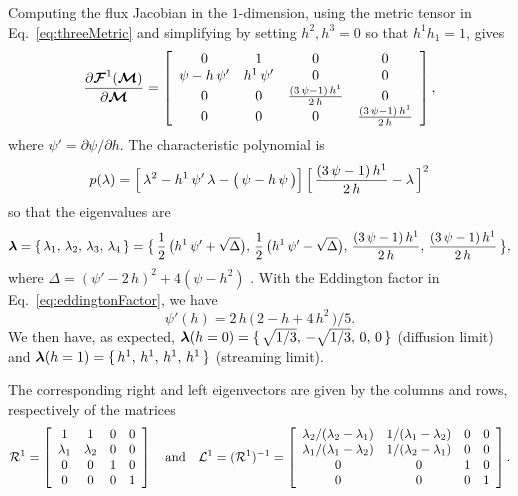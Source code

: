 \documentclass[10pt,preprint]{aastex}
\begin{document}
Computing the flux Jacobian in the $1$-dimension, using the metric tensor in Eq.~\eqref{eq:threeMetric} and simplifying by setting $h^{2},h^{3}=0$ so that $h^{1}h_{1}=1$, gives
\begin{equation}
  \frac{\partial \boldsymbol{\mathcal{F}}^{1}(\boldsymbol{\mathcal{M}})}{\partial \boldsymbol{\mathcal{M}}}
  =\left[
  \begin{array}{cccc}
    0 & 1 & 0 & 0 \\
    \psi-h\,\psi' & h^{1}\,\psi' & 0 & 0 \\
    0 & 0 & \frac{(3\,\psi-1)\,h^{1}}{2\,h} & 0 \\
    0 & 0 & 0 & \frac{(3\,\psi-1)\,h^{1}}{2\,h}
  \end{array}
  \right],
\end{equation}
where $\psi'=\partial\psi/\partial h$.  
The characteristic polynomial is
\begin{equation}
  p(\lambda)=\Big[\,\lambda^{2}-h^{1}\,\psi'\,\lambda-\big(\,\psi-h\,\psi\,\big)\Big]\,\Big[\,\frac{(3\,\psi-1)\,h^{1}}{2\,h}-\lambda\,\Big]^{2}
\end{equation}
so that the eigenvalues are
\begin{equation}
  \boldsymbol{\lambda}
  =\{\,\lambda_{1},\,\lambda_{2},\,\lambda_{3},\,\lambda_{4}\,\}
  =\big\{\,\frac{1}{2}\,\big(h^{1}\,\psi'+\sqrt{\Delta}\big),\,\frac{1}{2}\,\big(h^{1}\,\psi'-\sqrt{\Delta}\big),\,\frac{(3\,\psi-1)\,h^{1}}{2\,h},\,\frac{(3\,\psi-1)\,h^{1}}{2\,h}\,\big\},
\end{equation}
where $\Delta=(\psi'-2\,h)^{2}+4(\psi-h^{2})$ \citep[cf.][]{pons_etal_2000}.  
With the Eddington factor in Eq.~\eqref{eq:eddingtonFactor}, we have
\begin{equation}
  \psi'(h)=2\,h\,\big(\,2-h+4\,h^{2}\,\big)/5.  
\end{equation}
We then have, as expected, $\boldsymbol{\lambda}(h=0)=\{\,\sqrt{1/3},\,-\sqrt{1/3},\,0,\,0\,\}$ (diffusion limit) and $\boldsymbol{\lambda}(h=1)=\{\,h^{1},\,h^{1},\,h^{1},\,h^{1}\,\}$ (streaming limit).  

The corresponding right and left eigenvectors are given by the columns and rows, respectively of the matrices
\begin{equation}
  \mathcal{R}^{1}
  =\left[
  \begin{array}{cccc}
    1 & 1 & 0 & 0 \\
    \lambda_{1} & \lambda_{2} & 0 & 0 \\
    0 & 0 & 1 & 0 \\
    0 & 0 & 0 & 1
  \end{array}
  \right]
  \quad\text{and}\quad
  \mathcal{L}^{1}=(\mathcal{R}^{1})^{-1}
  =\left[
  \begin{array}{cccc}
  \lambda_{2}/(\lambda_{2}-\lambda_{1}) & 1/(\lambda_{1}-\lambda_{2}) & 0 & 0 \\
  \lambda_{1}/(\lambda_{1}-\lambda_{2}) & 1/(\lambda_{2}-\lambda_{1}) & 0 & 0 \\
  0 & 0 & 1 & 0 \\
  0 & 0 & 0 & 1
  \end{array}
  \right].  
\end{equation}
\end{document}
